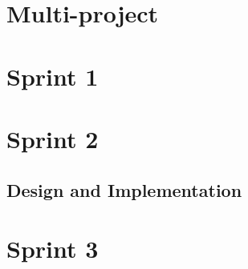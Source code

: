 \chapter{Multi-project}\label{multiproject}



\chapter{Sprint 1}\label{sprint1}

\newpage




















\chapter{Sprint 2}


\newpage




\section{Design and Implementation}











\chapter{Sprint 3}







